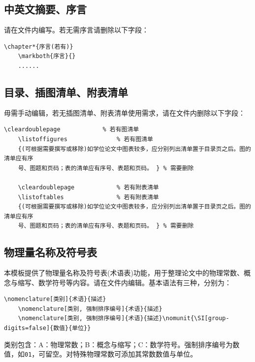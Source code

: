 \subsection{中英文摘要、序言}
请在文件内编写。若无需序言请删除以下字段：

\begin{lstlisting}[language={[LaTeX]TeX}]
    \chapter*{序言(若有)}
    \markboth{序言}{}
    ......
\end{lstlisting}

\subsection{目录、插图清单、附表清单}
毋需手动编辑，若无插图清单、附表清单使用需求，请在文件内删除以下字段：
\begin{lstlisting}[language={[LaTeX]TeX}]
    \cleardoublepage            % 若有图清单
    \listoffigures              % 若有图清单
    {(可根据需要撰写或移除)如学位论文中图表较多，应分别列出清单置于目录页之后。图的清单应有序
    号、图题和页码；表的清单应有序号、表题和页码。 } % 需要删除
    
    \cleardoublepage            % 若有附表清单
    \listoftables               % 若有附表清单
    {(可根据需要撰写或移除)如学位论文中图表较多，应分别列出清单置于目录页之后。图的清单应有序
    号、图题和页码；表的清单应有序号、表题和页码。 } % 需要删除
\end{lstlisting}

\subsection{物理量名称及符号表}
本模板提供了物理量名称及符号表(术语表)功能，用于整理论文中的物理常数、概念与缩写、数学符号等内容。请在文件内编辑。基本语法有三种，分别为：

\begin{lstlisting}[language={[LaTeX]TeX}]
    \nomenclature[类别]{术语}{描述}
    \nomenclature[类别, 强制排序编号]{术语}{描述}
    \nomenclature[类别, 强制排序编号]{术语}{描述}\nomunit{\SI[group-digits=false]{数值}{单位}}
\end{lstlisting}

类别包含：A：物理常数；B：概念与缩写；C：数学符号。强制排序编号为数值，如\texttt{01}，可留空。对特殊物理常数可添加其常数数值与单位。

